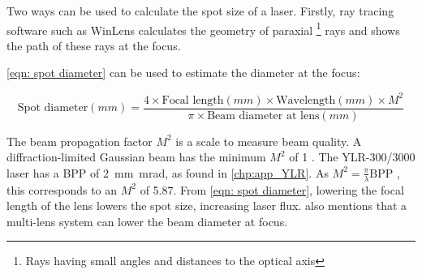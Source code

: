             Two ways can be used to calculate the spot size of a laser. Firstly, ray tracing software such as WinLens calculates the geometry of paraxial \footnote{Rays having small angles and distances to the optical axis} rays and shows the path of these rays at the focus. 
            
            \autoref{eqn: spot diameter} \cite{LaserSpotSize} can be used to estimate the diameter at the focus:
            
            \begin{equation}\label{eqn: spot diameter}
                \text{Spot diameter}(mm) = \frac{4 \times \text{Focal length}(mm) \times \text{Wavelength}(mm) \times M^2}{\pi \times \text{Beam diameter at lens}(mm)}
            \end{equation}

            The beam propagation factor $M^2$ is a scale to measure beam quality. A diffraction-limited Gaussian beam has the minimum $M^2$ of 1 \textcite{hechtUnderstandingLasersEntry2019}. The YLR-300/3000 laser has a BPP of \qty{2}{mm.mrad}, as found in \autoref{chp:app_YLR}. As $M^2 = \frac{\pi}{\lambda} \text{BPP}$ \cite{paschottaBeamParameterProduct}, this corresponds to an $M^2$ of 5.87. From \autoref{eqn: spot diameter}, lowering the focal length of the lens lowers the spot size, increasing laser flux. \textcite{LensTutorial} also mentions that a multi-lens system can lower the beam diameter at focus.
            
